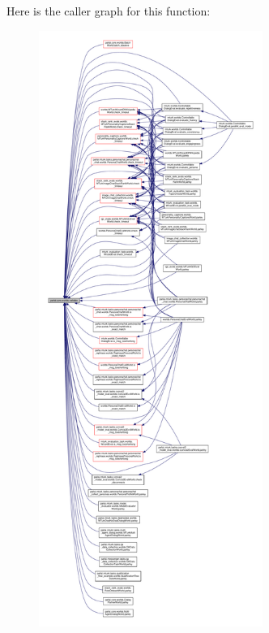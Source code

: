 Here is the caller graph for this function\+:
\nopagebreak
\begin{figure}[H]
\begin{center}
\leavevmode
\includegraphics[height=550pt]{namespaceparlai_1_1core_1_1worlds_afc3fad603b7bce41dbdc9cdc04a9c794_icgraph}
\end{center}
\end{figure}
